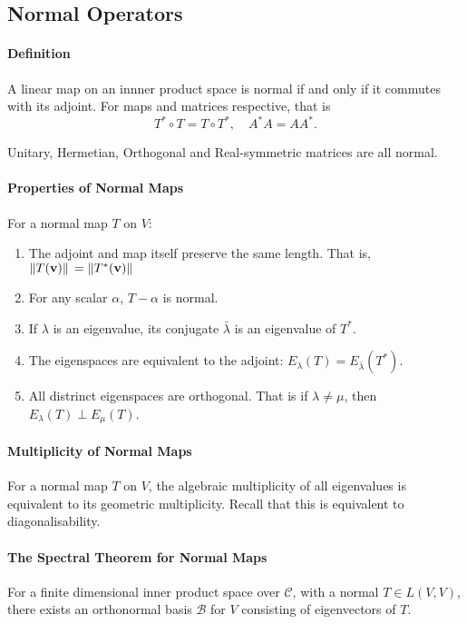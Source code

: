 %
%
%
\subsection{Normal Operators}

\paragraph{Definition}
A linear map on an innner product space is normal if and only if
it commutes with its adjoint. For maps and matrices respective, that is \[
    T^* \circ T = T \circ T^*,  \quad A^* A = A A^*
.\]

Unitary, Hermetian, Orthogonal and Real-symmetric matrices are all normal.

\paragraph{Properties of Normal Maps}
For a normal map \( T \) on \( V \):
\begin{enumerate}
    \item The adjoint and map itself preserve the same length. That is,
        \( \norm*{T(\mathbf{v})} = \norm*{T^*(\mathbf{v})} \)
    \item For any scalar \( \alpha \), \( T - \alpha \) is normal.
    \item If \( \lambda \) is an eigenvalue, its conjugate \( \bar{\lambda} \)
        is an eigenvalue of \( T^* \).
        \item The eigenspaces are equivalent to the adjoint:
            \( E_\lambda(T) = E_{\bar{\lambda}}(T^*) \).
    \item All distrinct eigenspaces are orthogonal. That is if \( \lambda \neq \mu \),
        then \( E_\lambda(T) \perp E_\mu(T) \).
\end{enumerate}

\paragraph{Multiplicity of Normal Maps}
For a normal map \( T \) on \( V \), the algebraic multiplicity of
all eigenvalues is equivalent to its geometric multiplicity.
Recall that this is equivalent to diagonalisability.

\paragraph{The Spectral Theorem for Normal Maps}
For a finite dimensional inner product space over \( \mathcal{C} \),
with a normal \( T \in L(V, V) \), there exists an orthonormal basis
\( \mathcal{B} \) for \( V \) consisting of eigenvectors of \( T \).

